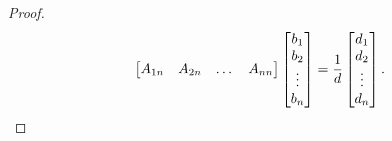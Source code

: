 \begin{theorem}[克拉默法则]
\begin{proof}
\[\begin{bmatrix}
		A_{1n} & A_{2n} & \dots & A_{nn}
	\end{bmatrix} \begin{bmatrix} b_1 \\ b_2 \\ \vdots \\ b_n \end{bmatrix}
	= \frac{1}{d} \begin{bmatrix} d_1 \\ d_2 \\ \vdots \\ d_n \end{bmatrix}.
	\qedhere
\]
\end{proof}
\end{theorem}
